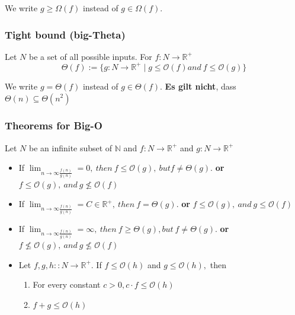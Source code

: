 \documentclass[a4paper]{article}
\begin{document}
    We write $g \geq \Omega(f)$ instead of $g \in \Omega(f)$.
    
    \subsubsection*{Tight bound (big-Theta)}
    Let ${N}$ be a set of all possible inputs. For $f: N \to \mathbb{R}^+$
    $$\Theta(f) :=\lbrace g: {N}\to\mathbb{R}^+\mid g \leq \mathcal{O}(f) and \ f \leq \mathcal{O}(g)\rbrace$$
    
    We write $g = \Theta(f)$ instead of $g \in \Theta(f)$.
    \textbf{Es gilt nicht}, dass $\Theta(n) \subseteq \Theta(n^2)$
    

    \subsubsection*{Theorems for Big-O}
    Let ${N}$ be an infinite subset of $\mathbb{N}$ and $f: N \to \mathbb{R}^+$ and $g: N \to \mathbb{R}^+$

    \begin{itemize}
        \item If $\lim_{n\to \infty \frac{f(n)}{g(n)}} = 0,\  then \ f\leq \mathcal{O}(g),\ but f \neq \Theta(g).$ \textbf{or} $ f\leq \mathcal{O}(g), \ and \ g \nleq \mathcal{O}(f)$
        \item If $\lim_{n\to \infty \frac{f(n)}{g(n)}} = C \in \mathbb{R}^+,\ then \ f = \Theta(g).$ 
            \textbf{or} $ f\leq \mathcal{O}(g), \ and \ g \leq \mathcal{O}(f)$
        \item If $\lim_{n\to \infty \frac{f(n)}{g(n)}} = \infty,\ then \ f \geq \Theta(g), but \ f \neq \Theta(g).$
        \textbf{or} $ f\nleq \mathcal{O}(g), \ and \ g \nleq \mathcal{O}(f)$

        \item Let $f,g,h :: N \to \mathbb{R}^+.$ If $f \leq \mathcal{O}(h)$ and $ g \leq \mathcal{O}(h),$ then
        \begin{enumerate}
            \item For every constant $c > 0, c \cdot f \leq \mathcal{O}(h)$
            \item $f + g \leq \mathcal{O}(h)$
        \end{enumerate}
    \end{itemize}

   
\end{document}
